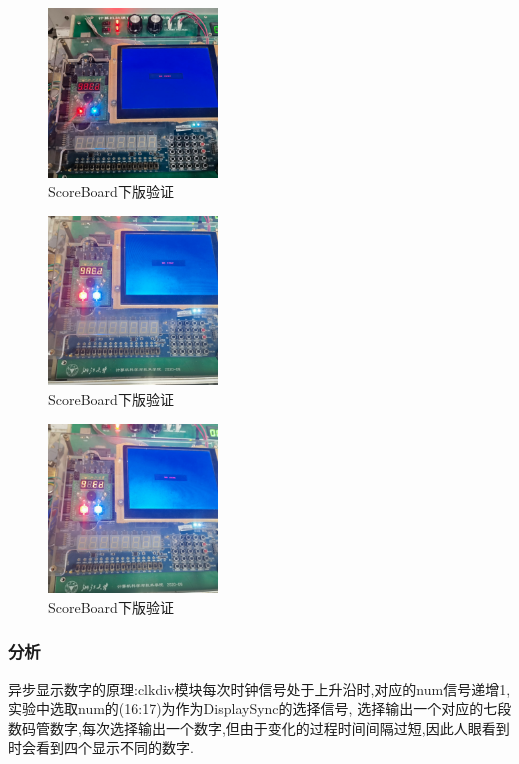 \documentclass{article}
\begin{document}
    \begin{figure}[H]
    \centering
    \includegraphics[width=0.4\textwidth]{lab7/10.jpg}
    \caption{\label{Lab7}ScoreBoard下版验证}
    \end{figure}


    \begin{figure}[H]
    \centering
    \includegraphics[width=0.4\textwidth]{lab7/11.jpg}
    \caption{\label{Lab7}ScoreBoard下版验证}
    \end{figure}

    \begin{figure}[H]
    \centering
    \includegraphics[width=0.4\textwidth]{lab7/12.jpg}
    \caption{\label{Lab7}ScoreBoard下版验证}
    \end{figure}
\subsubsection*{分析}
异步显示数字的原理:clkdiv模块每次时钟信号处于上升沿时,对应的num信号递增1,实验中选取num的(16:17)为作为DisplaySync的选择信号,
选择输出一个对应的七段数码管数字,每次选择输出一个数字,但由于变化的过程时间间隔过短,因此人眼看到时会看到四个显示不同的数字.
\end{document}
